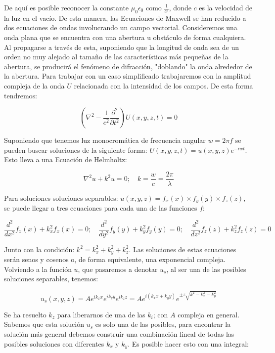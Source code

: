 De aquí es posible reconocer la constante $\mu_0\epsilon_0$ como $\frac{1}{c^2}$, donde $c$ es la velocidad de la luz en el vacío. De esta manera, las Ecuaciones de Maxwell se han reducido a dos ecuaciones de ondas involucrando un campo vectorial. Consideremos una onda plana que se encuentra con una abertura u obstáculo de forma cualquiera. Al propagarse a través de esta, suponiendo que la longitud de onda sea de un orden no muy alejado al tamaño de las características más pequeñas de la abertura, se producirá el fenómeno de difracción, "doblando" la onda alrededor de la abertura. Para trabajar con un caso simplificado trabajaremos con la amplitud compleja de la onda $U$ relacionada con la intensidad de los campos. De esta forma tendremos: 

\begin{equation}
    \left(\nabla^2 - \frac{1}{c^2} \frac{\partial^2 }{\partial t^2}\right) U(x, y, z, t) = 0
\end{equation}

Suponiendo que tenemos luz monocromática de frecuencia angular $w = 2\pi f$ se pueden buscar soluciones de la siguiente forma: $U(x, y, z, t) = u(x, y, z)e^{-iwt}$. Esto lleva a una Ecuación de Helmholtz:

\begin{equation}
    \nabla^2 u + k^2u = 0; \quad k = \frac w c = \frac {2\pi}{\lambda}
\end{equation}

Para soluciones soluciones separables: $u(x, y, z) = f_x(x)\times f_y(y)\times f_z(z)$, se puede llegar a tres ecuaciones para cada una de las funciones $f$:

$$
    \frac{d^2}{dx^2} f_x(x) + k_x^2f_x(x) = 0;  \quad
    \frac{d^2}{dy^2} f_y(y) + k_y^2f_y(y) = 0;  \quad
    \frac{d^2}{dz^2} f_z(z) + k_z^2f_z(z) = 0  
$$

Junto con la condición: $k^2 = k_x^2 + k_y^2 + k_z^2$. Las soluciones de estas ecuaciones serán senos y cosenos o, de forma equivalente, una exponencial compleja. Volviendo a la función $u$, que pasaremos a denotar $u_s$, al ser una de las posibles soluciones separables, tenemos:

\begin{equation}
    u_s(x, y, z) = Ae^{ik_x x}e^{ik_y y}e^{ik_z z} = A e^{i(k_x x + k_y y )} e^{\pm z \sqrt{k^2 - k_x^2 - k_y^2}}
\end{equation}

Se ha resuelto $k_z$ para liberarnos de una de las $k_i$; con $A$ compleja en general. Sabemos que esta solución $u_s$ es solo una de las posibles, para encontrar la solución más general debemos construir una combinación lineal de todas las posibles soluciones con diferentes $k_x$ y $k_y$. Es posible hacer esto con una integral:

